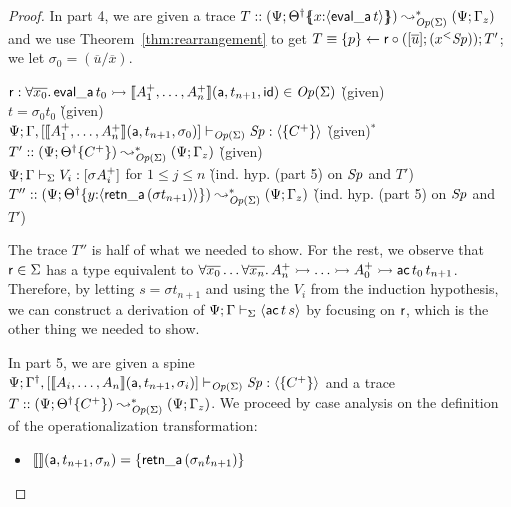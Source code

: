 \begin{proof}
In part 4, we are given a trace 
$T :: (\Psi; {{{\Theta}^\dag}}\mbox{$\{\hspace{-4pt}\{$}{x{:}\langle {{\sf eval\_a}\,t} \rangle}\mbox{$\}\hspace{-4pt}\}$}) 
       \leadsto^*_{{\it Op}({\Sigma})} 
      (\Psi; \Gamma_z)$
and we use Theorem~\ref{thm:rearrangement} to get
$T \equiv \{{p}\} \leftarrow {{\sf r}} \circ {([{\overline{u}}]; {({x}{^{<}}{{\it Sp}})})}; T'$;
we let $\sigma_0 = (\overline{u}/\overline{x})$. 
\begin{tabbing}
${\sf r} : \forall \overline{x_0}.\, {\sf eval\_a}\,t_0 \rightarrowtail 
   \llbracket {A^+_1, \ldots, A^+_n} \rrbracket({\sf a},{t_{n+1}},{\sf id}) \in {\it Op}({\Sigma})$ 
 \` (given)
\\
$t = {\sigma_0}t_0$ 
 \` (given)
\\
${\Psi}; {\Gamma,[\llbracket {A_1^+,\ldots,A_n^+} \rrbracket({\sf a},{t_{n+1}},{\sigma_0})]} \vdash_{{\it Op}({\Sigma})} {{\it Sp}} : {\langle {\{ C^+ \}} \rangle}$ 
 \` (given)$^*$
\\
$T' :: (\Psi; {{{\Theta}^\dag}}\{{C^+}\})
         \leadsto^*_{{\it Op}({\Sigma})}
       (\Psi; \Gamma_z)$ 
 \` (given)
\\
${\Psi}; {\Gamma} \vdash_{\Sigma} {V_i} : {[\sigma{A^+_i}]}$ for $1 \leq j \leq n$
\` (ind. hyp. (part 5) on ${\it Sp}$ and $T'$)
\\
$T'' :: (\Psi; {{{\Theta}^\dag}}\{{y{:}\langle {{\sf retn\_a}\,({\sigma}t_{n+1})} \rangle}\})
         \leadsto^*_{{\it Op}({\Sigma})}
        (\Psi; \Gamma_z)$
\` (ind. hyp. (part 5) on ${\it Sp}$ and $T'$)
\end{tabbing}

\noindent
The trace $T''$ is half of what we needed to show. For the rest, we observe
that ${\sf r} \in \Sigma$ has a type equivalent to
$\forall \overline{x_0}\ldots \forall \overline{x_n}.\,
  A^+_n \rightarrowtail \ldots \rightarrowtail A^+_0 \rightarrowtail {\sf ac}\,t_0\,t_{n+1}$. Therefore,
by letting
$s = {\sigma}t_{n+1}$ and using the $V_i$ from the induction hypothesis,
we can construct a derivation of 
${\Psi}; {\Gamma} \vdash_{\Sigma} {\langle {{\sf ac}\,t\,s} \rangle}$ by focusing on
${\sf r}$, which is the other thing we needed to show.

In part 5, we are given a spine
${\Psi}; {{{\Gamma}^\dag},[\llbracket {A_i,\ldots,A_n} \rrbracket({\sf a},{t_{n+1}},{\sigma_i})]} \vdash_{{\it Op}({\Sigma})} {{\it Sp}} : {\langle {\{C^+\}} \rangle}$ and a trace
$T :: (\Psi; {{{\Theta}^\dag}}\{{C^+}\})
         \leadsto^*_{{\it Op}({\Sigma})}
       (\Psi; \Gamma_z)$. We proceed by case analysis on the definition of
the operationalization transformation:
\begin{itemize}
\item $\llbracket {} \rrbracket({\sf a},{t_{n+1}},{\sigma_n}) = \{ {\sf retn\_a}\,(\sigma_{n}{t_{n+1}}) \}$


\end{itemize}
\end{proof}
